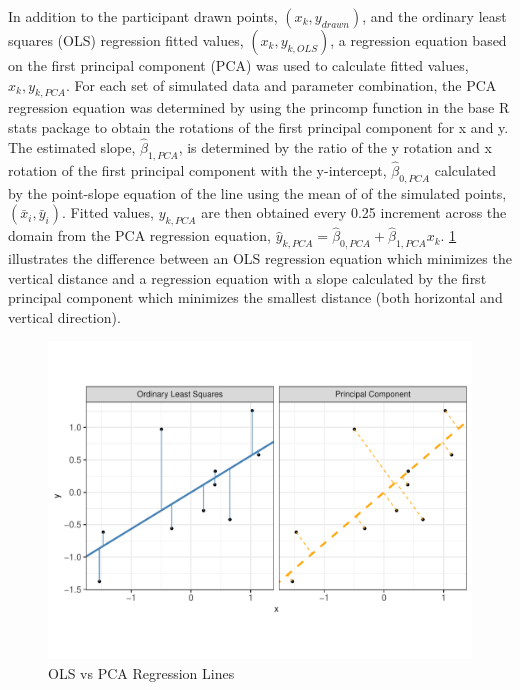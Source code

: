 \documentclass[print]{nuthesis}
\begin{document}
In addition to the participant drawn points, \((x_k, y_{drawn})\), and the ordinary least squares (OLS) regression fitted values, \((x_k, y_{k,OLS})\), a regression equation based on the first principal component (PCA) was used to calculate fitted values, \(x_k, y_{k,PCA}\).
For each set of simulated data and parameter combination, the PCA regression equation was determined by using the princomp function in the base R stats package to obtain the rotations of the first principal component for x and y.
The estimated slope, \(\hat\beta_{1,PCA}\), is determined by the ratio of the y rotation and x rotation of the first principal component with the y-intercept, \(\hat\beta_{0,PCA}\) calculated by the point-slope equation of the line using the mean of of the simulated points, \((\bar x_i, \bar y_i)\).
Fitted values, \(y_{k,PCA}\) are then obtained every 0.25 increment across the domain from the PCA regression equation, \(\hat y_{k,PCA} = \hat\beta_{0,PCA} + \hat\beta_{1,PCA} x_k\).
\cref{fig:ols-vs-pca-example} illustrates the difference between an OLS regression equation which minimizes the vertical distance and a regression equation with a slope calculated by the first principal component which minimizes the smallest distance (both horizontal and vertical direction).

\begin{figure}[tbp]

{\centering \includegraphics[width=1\linewidth,]{thesis_files/figure-latex/ols-vs-pca-example-1} 

}

\caption{OLS vs PCA Regression Lines}\label{fig:ols-vs-pca-example}
\end{figure}
\end{document}
